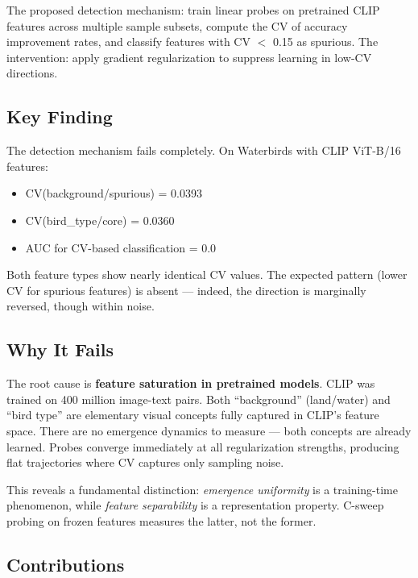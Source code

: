The proposed detection mechanism: train linear probes on pretrained CLIP features across multiple sample subsets, compute the CV of accuracy improvement rates, and classify features with CV $<$ 0.15 as spurious. The intervention: apply gradient regularization to suppress learning in low-CV directions.

\subsection{Key Finding}

The detection mechanism fails completely. On Waterbirds with CLIP ViT-B/16 features:

\begin{itemize}
    \item CV(background/spurious) = 0.0393
    \item CV(bird\_type/core) = 0.0360
    \item AUC for CV-based classification = 0.0
\end{itemize}

Both feature types show nearly identical CV values. The expected pattern (lower CV for spurious features) is absent --- indeed, the direction is marginally reversed, though within noise.

\subsection{Why It Fails}

The root cause is \textbf{feature saturation in pretrained models}. CLIP was trained on 400 million image-text pairs. Both ``background'' (land/water) and ``bird type'' are elementary visual concepts fully captured in CLIP's feature space. There are no emergence dynamics to measure --- both concepts are already learned. Probes converge immediately at all regularization strengths, producing flat trajectories where CV captures only sampling noise.

This reveals a fundamental distinction: \emph{emergence uniformity} is a training-time phenomenon, while \emph{feature separability} is a representation property. C-sweep probing on frozen features measures the latter, not the former.

\subsection{Contributions}

